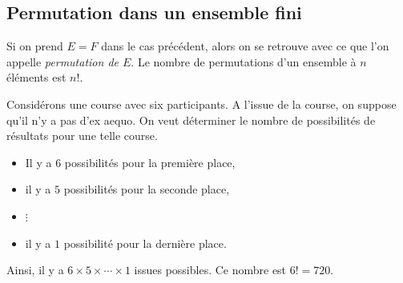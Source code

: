             \subsection{Permutation dans un ensemble fini}
                  Si on prend $E = F$ dans le cas pr\'ec\'edent, alors on se retrouve avec ce que l'on appelle
                  \emph{permutation de $E$}.
                  Le nombre de permutations d'un ensemble \`a $n$ \'el\'ements est $n!$.
                  \begin{ex}
                        Consid\'erons une course avec six participants. 
                        A l'issue de la course, on suppose qu'il n'y a pas d'ex aequo.
                        On veut d\'eterminer le nombre de possibilit\'es de r\'esultats pour une telle course.
                     \begin{valiny}
                        \begin{itemize}
                              \item Il y a $6$ possibilit\'es pour la premi\`ere place,
                              \item il y a $5$ possibilit\'es pour la seconde place,
                              \item $\vdots$ 
                              \item il y a $1$ possibilit\'e pour la derni\`ere place.
                        \end{itemize}
                        Ainsi, il y a $6 \times 5 \times \cdots \times 1$ issues possibles.
                        Ce nombre est $6! = 720$.
                     \end{valiny}
                  \end{ex}
